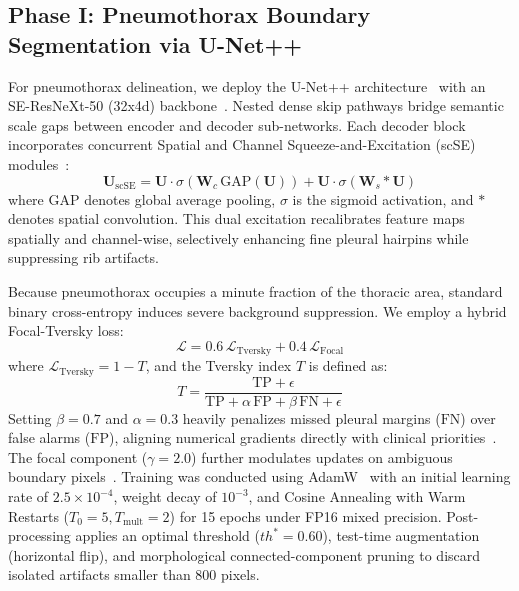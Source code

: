 \documentclass[10pt,twocolumn,letterpaper]{article}
\begin{document}
\subsection{Phase I: Pneumothorax Boundary Segmentation via U-Net++}
For pneumothorax delineation, we deploy the U-Net++ architecture~\cite{zhou2018unetplusplus} with an SE-ResNeXt-50 (32x4d) backbone~\cite{xie2017resnext,hu2018senet}. Nested dense skip pathways bridge semantic scale gaps between encoder and decoder sub-networks. Each decoder block incorporates concurrent Spatial and Channel Squeeze-and-Excitation (scSE) modules~\cite{roy2018scse}:
\begin{equation}
\mathbf{U}_{\text{scSE}} = \mathbf{U} \cdot \sigma(\mathbf{W}_c \, \text{GAP}(\mathbf{U})) + \mathbf{U} \cdot \sigma(\mathbf{W}_s * \mathbf{U})
\end{equation}
where $\text{GAP}$ denotes global average pooling, $\sigma$ is the sigmoid activation, and $*$ denotes spatial convolution. This dual excitation recalibrates feature maps spatially and channel-wise, selectively enhancing fine pleural hairpins while suppressing rib artifacts.

Because pneumothorax occupies a minute fraction of the thoracic area, standard binary cross-entropy induces severe background suppression. We employ a hybrid Focal-Tversky loss:
\begin{equation}
\mathcal{L} = 0.6 \, \mathcal{L}_{\text{Tversky}} + 0.4 \, \mathcal{L}_{\text{Focal}}
\end{equation}
where $\mathcal{L}_{\text{Tversky}} = 1 - T$, and the Tversky index $T$ is defined as:
\begin{equation}
T = \frac{\text{TP} + \epsilon}{\text{TP} + \alpha \, \text{FP} + \beta \, \text{FN} + \epsilon}
\end{equation}
Setting $\beta = 0.7$ and $\alpha = 0.3$ heavily penalizes missed pleural margins ($\text{FN}$) over false alarms ($\text{FP}$), aligning numerical gradients directly with clinical priorities~\cite{salehi2017tversky}. The focal component ($\gamma = 2.0$) further modulates updates on ambiguous boundary pixels~\cite{lin2017focal}. Training was conducted using AdamW~\cite{loshchilov2019adamw} with an initial learning rate of $2.5 \times 10^{-4}$, weight decay of $10^{-3}$, and Cosine Annealing with Warm Restarts ($T_0=5, T_{\text{mult}}=2$) for 15 epochs under FP16 mixed precision. Post-processing applies an optimal threshold ($th^* = 0.60$), test-time augmentation (horizontal flip), and morphological connected-component pruning to discard isolated artifacts smaller than 800 pixels.
\end{document}
